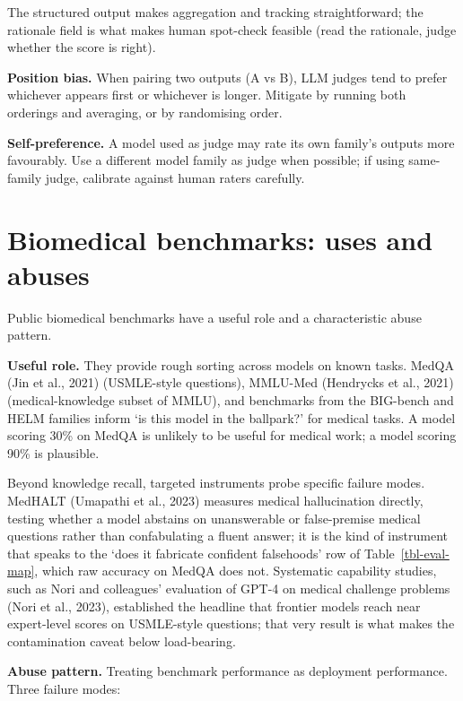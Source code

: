 \documentclass[
  letterpaper,
  11pt]{scrbook}
\begin{document}
The structured output makes aggregation and tracking straightforward;
the rationale field is what makes human spot-check feasible (read the
rationale, judge whether the score is right).

\textbf{Position bias.} When pairing two outputs (A vs B), LLM judges
tend to prefer whichever appears first or whichever is longer. Mitigate
by running both orderings and averaging, or by randomising order.

\textbf{Self-preference.} A model used as judge may rate its own
family's outputs more favourably. Use a different model family as judge
when possible; if using same- family judge, calibrate against human
raters carefully.

\section{Biomedical benchmarks: uses and
abuses}\label{biomedical-benchmarks-uses-and-abuses}

Public biomedical benchmarks have a useful role and a characteristic
abuse pattern.

\textbf{Useful role.} They provide rough sorting across models on known
tasks. MedQA (Jin et al., 2021) (USMLE-style questions), MMLU-Med
(Hendrycks et al., 2021) (medical-knowledge subset of MMLU), and
benchmarks from the BIG-bench and HELM families inform `is this model in
the ballpark?' for medical tasks. A model scoring 30\% on MedQA is
unlikely to be useful for medical work; a model scoring 90\% is
plausible.

Beyond knowledge recall, targeted instruments probe specific failure
modes. MedHALT (Umapathi et al., 2023) measures medical hallucination
directly, testing whether a model abstains on unanswerable or
false-premise medical questions rather than confabulating a fluent
answer; it is the kind of instrument that speaks to the `does it
fabricate confident falsehoods' row of Table~\ref{tbl-eval-map}, which
raw accuracy on MedQA does not. Systematic capability studies, such as
Nori and colleagues' evaluation of GPT-4 on medical challenge problems
(Nori et al., 2023), established the headline that frontier models reach
near expert-level scores on USMLE-style questions; that very result is
what makes the contamination caveat below load-bearing.

\textbf{Abuse pattern.} Treating benchmark performance as deployment
performance. Three failure modes:
\end{document}
